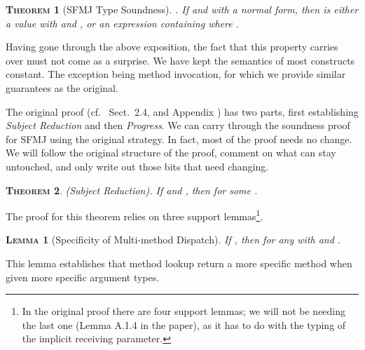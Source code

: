 \documentclass[11pt]{article}
\newtheorem{theorem}{\textsc{Theorem}}[section]
\newtheorem{lemma}{\textsc{Lemma}}[section]
\begin{document}
\begin{theorem}[SFMJ Type Soundness]. If  and  with  a normal form, then  is either a value  with  and , or an expression containing  where .
\end{theorem}

\medskip

Having gone through the above exposition, the fact that this property carries over must not come as a surprise. We have kept the semantics of most constructs constant. The exception being method invocation, for which we provide similar guarantees as the original. 

The original proof (cf.~\cite{fjtoplas01} Sect.~2.4, and Appendix ) has two parts, first establishing \emph{Subject Reduction} and then \emph{Progress}. We can carry through the soundness proof for SFMJ using the original strategy. In fact, most of the proof needs no change. We will follow the original structure of the proof, comment on what can stay untouched, and only write out those bits that need changing.



\begin{theorem}
(Subject Reduction). If  and , then  for some .
\end{theorem}

\noindent The proof for this theorem relies on three support lemmas\footnote{In the original proof there are four support lemmas; we will not be needing the last one (Lemma A.1.4 in the paper), as it has to do with the typing of the implicit receiving parameter.}.

\medskip

\noindent\begin{lemma}[Specificity of Multi-method Dispatch]
If , then for any   with  and .
\end{lemma}

\noindent This lemma establishes that method lookup return a more specific method when given more specific argument types.
\end{document}
